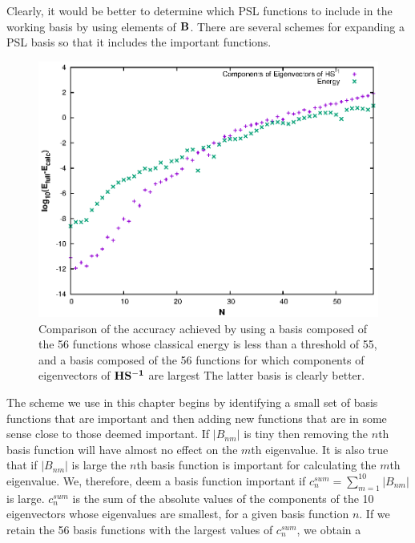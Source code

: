 % 
%
Clearly,  it would be better to determine which PSL functions to include in the  working basis  by using  elements of   ${\bf{    B  }} $.    There are several schemes for expanding 
a PSL basis so that it includes the important functions.  \cite{Shimshovitz2014,Brown2015b}
%
\begin{figure}[t]
\includegraphics[width=6.5in]{./JCP2/fig3.eps}
\caption[Comparison of accuracy of classical energy and basis building scheme using phase-space localized basis functions.]{Comparison of the accuracy achieved by using a basis  composed of the 56 functions whose classical energy  is less than a threshold of 55,
%
and a basis 
composed of  the 56 functions for which components of eigenvectors of ${\bf{  H S^{-1}}}$  are largest        
 The latter basis is clearly better.\label{Fig.coefvE}}
\end{figure}
%
The scheme we use in this chapter begins by identifying 
a small set of  
 basis functions that are
 important and then adding new functions that are in some sense close 
to those deemed important.  
%
If  $\vert B_{nm}\vert$ is tiny then removing the $n$th basis function will have almost no effect on the    $m$th eigenvalue.   \cite{Brown2015b}  
It is also true that  if   $\vert B_{nm}\vert$  is large the  $n$th basis function is  important for calculating the    $m$th eigenvalue. 
We, therefore, deem a basis function important if 
$c^{sum}_n=\sum_{m=1}^{10} \left|  B_{nm}  \right|$ is large.     $c^{sum}_n$ is  the sum of the      
absolute values of  the components  of 
the 10 eigenvectors whose eigenvalues are smallest,   for a given basis function $n$. 
%
If we retain the 56 basis functions with the largest values of $c^{sum}_n$,  we obtain a 
